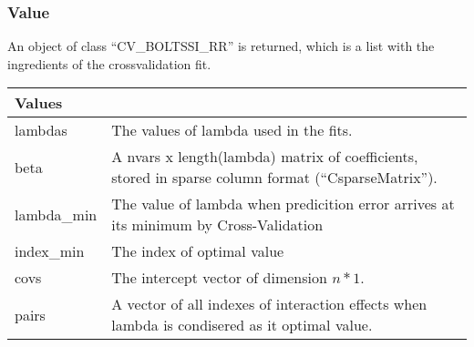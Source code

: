 \documentclass[]{article}
\begin{document}
\subsubsection{Value}\label{value-1}

An object of class ``CV\_BOLTSSI\_RR'' is returned, which is a list with
the ingredients of the crossvalidation fit.

\begin{longtable}[]{@{}ll@{}}
\toprule
\begin{minipage}[b]{0.19\columnwidth}\raggedright\strut
Values\strut
\end{minipage} & \begin{minipage}[b]{0.75\columnwidth}\raggedright\strut
\strut
\end{minipage}\tabularnewline
\midrule
\endhead
\begin{minipage}[t]{0.19\columnwidth}\raggedright\strut
lambdas\strut
\end{minipage} & \begin{minipage}[t]{0.75\columnwidth}\raggedright\strut
The values of lambda used in the fits.\strut
\end{minipage}\tabularnewline
\begin{minipage}[t]{0.19\columnwidth}\raggedright\strut
beta\strut
\end{minipage} & \begin{minipage}[t]{0.75\columnwidth}\raggedright\strut
A nvars x length(lambda) matrix of coefficients, stored in sparse column
format (``CsparseMatrix'').\strut
\end{minipage}\tabularnewline
\begin{minipage}[t]{0.19\columnwidth}\raggedright\strut
lambda\_min\strut
\end{minipage} & \begin{minipage}[t]{0.75\columnwidth}\raggedright\strut
The value of lambda when predicition error arrives at its minimum by
Cross-Validation\strut
\end{minipage}\tabularnewline
\begin{minipage}[t]{0.19\columnwidth}\raggedright\strut
index\_min\strut
\end{minipage} & \begin{minipage}[t]{0.75\columnwidth}\raggedright\strut
The index of optimal value\strut
\end{minipage}\tabularnewline
\begin{minipage}[t]{0.19\columnwidth}\raggedright\strut
covs\strut
\end{minipage} & \begin{minipage}[t]{0.75\columnwidth}\raggedright\strut
The intercept vector of dimension \(n*1\).\strut
\end{minipage}\tabularnewline
\begin{minipage}[t]{0.19\columnwidth}\raggedright\strut
pairs\strut
\end{minipage} & \begin{minipage}[t]{0.75\columnwidth}\raggedright\strut
A vector of all indexes of interaction effects when lambda is condisered
as it optimal value.\strut
\end{minipage}\tabularnewline
\bottomrule
\end{longtable}
\end{document}
